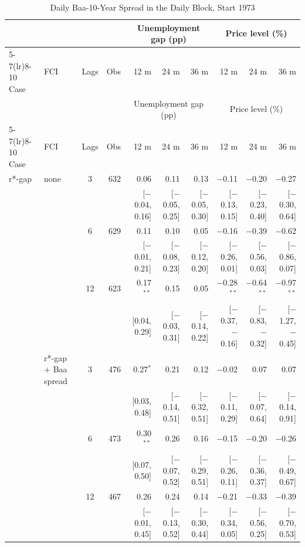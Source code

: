 \begingroup\scriptsize\setlength{\tabcolsep}{0.9pt}
\begin{longtable}{llcrrrrrrr}
\caption{Daily Baa-10-Year Spread in the Daily Block, Start 1973}\label{tab:appR3c73}\\
\toprule
 & & & & \multicolumn{3}{c}{Unemployment gap (pp)} & \multicolumn{3}{c}{Price level (\%)}\\ \cmidrule(lr){5-7}\cmidrule(lr){8-10}
Case & FCI & Lags & Obs & 12 m & 24 m & 36 m & 12 m & 24 m & 36 m\\
\midrule\endfirsthead
\toprule
 & & & & \multicolumn{3}{c}{Unemployment gap (pp)} & \multicolumn{3}{c}{Price level (\%)}\\ \cmidrule(lr){5-7}\cmidrule(lr){8-10}
Case & FCI & Lags & Obs & 12 m & 24 m & 36 m & 12 m & 24 m & 36 m\\
\midrule\endhead
\bottomrule\endfoot
r*-gap & none & 3 & 632 & 0.06 & 0.11 & 0.13 & $-$0.11 & $-$0.20 & $-$0.27\\
 & & & & {\scriptsize [$-$0.04, 0.16]} & {\scriptsize [$-$0.05, 0.25]} & {\scriptsize [$-$0.05, 0.30]} & {\scriptsize [$-$0.13, 0.15]} & {\scriptsize [$-$0.23, 0.40]} & {\scriptsize [$-$0.30, 0.64]}\\
 &  & 6 & 629 & 0.11 & 0.10 & 0.05 & $-$0.16 & $-$0.39 & $-$0.62\\
 & & & & {\scriptsize [$-$0.01, 0.21]} & {\scriptsize [$-$0.08, 0.23]} & {\scriptsize [$-$0.12, 0.20]} & {\scriptsize [$-$0.26, 0.01]} & {\scriptsize [$-$0.56, 0.03]} & {\scriptsize [$-$0.86, 0.07]}\\
 &  & 12 & 623 & 0.17$^{**}$ & 0.15 & 0.05 & $-$0.28$^{**}$ & $-$0.64$^{**}$ & $-$0.97$^{**}$\\
 & & & & {\scriptsize [0.04, 0.29]} & {\scriptsize [$-$0.03, 0.31]} & {\scriptsize [$-$0.14, 0.22]} & {\scriptsize [$-$0.37, $-$0.16]} & {\scriptsize [$-$0.83, $-$0.32]} & {\scriptsize [$-$1.27, $-$0.45]}\\
 & r*-gap + Baa spread & 3 & 476 & 0.27$^{*}$ & 0.21 & 0.12 & $-$0.02 & 0.07 & 0.07\\
 & & & & {\scriptsize [0.03, 0.48]} & {\scriptsize [$-$0.14, 0.51]} & {\scriptsize [$-$0.32, 0.51]} & {\scriptsize [$-$0.11, 0.29]} & {\scriptsize [$-$0.07, 0.64]} & {\scriptsize [$-$0.14, 0.91]}\\
 &  & 6 & 473 & 0.30$^{**}$ & 0.26 & 0.16 & $-$0.15 & $-$0.20 & $-$0.26\\
 & & & & {\scriptsize [0.07, 0.50]} & {\scriptsize [$-$0.07, 0.52]} & {\scriptsize [$-$0.29, 0.51]} & {\scriptsize [$-$0.26, 0.11]} & {\scriptsize [$-$0.36, 0.37]} & {\scriptsize [$-$0.49, 0.67]}\\
 &  & 12 & 467 & 0.26 & 0.24 & 0.14 & $-$0.21 & $-$0.33 & $-$0.39\\
 & & & & {\scriptsize [$-$0.01, 0.45]} & {\scriptsize [$-$0.13, 0.52]} & {\scriptsize [$-$0.30, 0.44]} & {\scriptsize [$-$0.34, 0.05]} & {\scriptsize [$-$0.56, 0.25]} & {\scriptsize [$-$0.70, 0.53]}\\
\end{longtable}
